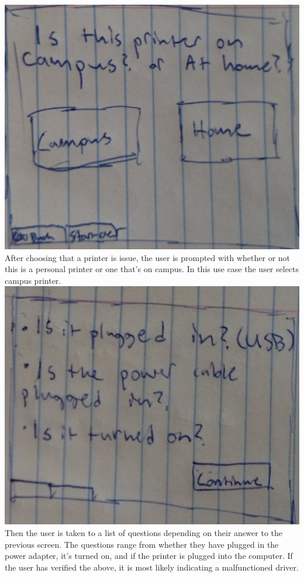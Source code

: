 \documentclass[12pt, letterpaper]{article}
\begin{document}
\begin{enumerate}
	\\\includegraphics[scale=.075]{campus_or_home.jpg}
	\\After choosing that a printer is issue, the user is prompted with whether or not this is a personal printer or one that’s on campus. In this use case the user selects campus printer.
	\\\includegraphics[scale=.075]{questions_1.jpg}
	\\Then the user is taken to a list of questions depending on their answer to the previous screen. The questions range from whether they have plugged in the power adapter, it’s turned on, and if the printer is plugged into the computer. If the user has verified the above, it is most likely indicating a malfunctioned driver.

\end{enumerate}
\end{document}
